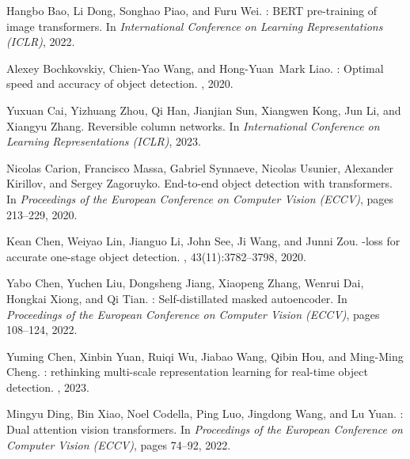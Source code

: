 \documentclass[10pt,twocolumn,letterpaper]{article}
\begin{document}
	{\small
	\begin{thebibliography}{10}\itemsep=-1pt
		
		Hangbo Bao, Li Dong, Songhao Piao, and Furu Wei.
		: {BERT} pre-training of image transformers.
		\newblock In {\em International Conference on Learning Representations (ICLR)},
		2022.
		
		Alexey Bochkovskiy, Chien-Yao Wang, and Hong-Yuan~Mark Liao.
		: Optimal speed and accuracy of object detection.
		, 2020.
		
		Yuxuan Cai, Yizhuang Zhou, Qi Han, Jianjian Sun, Xiangwen Kong, Jun Li, and
		Xiangyu Zhang.
		\newblock Reversible column networks.
		\newblock In {\em International Conference on Learning Representations (ICLR)},
		2023.
		
		Nicolas Carion, Francisco Massa, Gabriel Synnaeve, Nicolas Usunier, Alexander
		Kirillov, and Sergey Zagoruyko.
		\newblock End-to-end object detection with transformers.
		\newblock In {\em Proceedings of the European Conference on Computer Vision
			(ECCV)}, pages 213--229, 2020.
		
		Kean Chen, Weiyao Lin, Jianguo Li, John See, Ji Wang, and Junni Zou.
		-loss for accurate one-stage object detection.
		, 43(11):3782--3798, 2020.
		
		Yabo Chen, Yuchen Liu, Dongsheng Jiang, Xiaopeng Zhang, Wenrui Dai, Hongkai
		Xiong, and Qi Tian.
		: Self-distillated masked autoencoder.
		\newblock In {\em Proceedings of the European Conference on Computer Vision
			(ECCV)}, pages 108--124, 2022.
		
		Yuming Chen, Xinbin Yuan, Ruiqi Wu, Jiabao Wang, Qibin Hou, and Ming-Ming
		Cheng.
		: rethinking multi-scale representation learning for
		real-time object detection.
		, 2023.
		
		Mingyu Ding, Bin Xiao, Noel Codella, Ping Luo, Jingdong Wang, and Lu Yuan.
		: Dual attention vision transformers.
		\newblock In {\em Proceedings of the European Conference on Computer Vision
			(ECCV)}, pages 74--92, 2022.
		

\end{thebibliography}}
\end{document}

